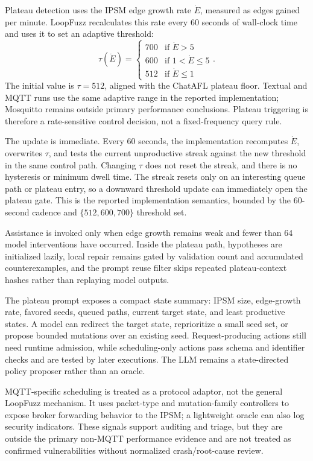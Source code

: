 \documentclass[final,5p,times,number]{elsarticle}
\begin{document}
Plateau detection uses the IPSM edge growth rate $\dot{E}$, measured as edges gained per minute. LoopFuzz recalculates this rate every 60 seconds of wall-clock time and uses it to set an adaptive threshold:
\[
\tau(\dot{E}) = \begin{cases}
700 & \text{if } \dot{E} > 5 \\
600 & \text{if } 1 < \dot{E} \le 5 \\
512 & \text{if } \dot{E} \le 1
\end{cases}.
\]
The initial value is $\tau{=}512$, aligned with the ChatAFL plateau floor. Textual and MQTT runs use the same adaptive range in the reported implementation; Mosquitto remains outside primary performance conclusions. Plateau triggering is therefore a rate-sensitive control decision, not a fixed-frequency query rule.

The update is immediate. Every 60 seconds, the implementation recomputes $\dot{E}$, overwrites $\tau$, and tests the current unproductive streak against the new threshold in the same control path. Changing $\tau$ does not reset the streak, and there is no hysteresis or minimum dwell time. The streak resets only on an interesting queue path or plateau entry, so a downward threshold update can immediately open the plateau gate. This is the reported implementation semantics, bounded by the 60-second cadence and $\{512,600,700\}$ threshold set.

Assistance is invoked only when edge growth remains weak and fewer than 64 model interventions have occurred. Inside the plateau path, hypotheses are initialized lazily, local repair remains gated by validation count and accumulated counterexamples, and the prompt reuse filter skips repeated plateau-context hashes rather than replaying model outputs.

The plateau prompt exposes a compact state summary: IPSM size, edge-growth rate, favored seeds, queued paths, current target state, and least productive states. A model can redirect the target state, reprioritize a small seed set, or propose bounded mutations over an existing seed. Request-producing actions still need runtime admission, while scheduling-only actions pass schema and identifier checks and are tested by later executions. The LLM remains a state-directed policy proposer rather than an oracle.

MQTT-specific scheduling is treated as a protocol adaptor, not the general LoopFuzz mechanism. It uses packet-type and mutation-family controllers to expose broker forwarding behavior to the IPSM; a lightweight oracle can also log security indicators. These signals support auditing and triage, but they are outside the primary non-MQTT performance evidence and are not treated as confirmed vulnerabilities without normalized crash/root-cause review.
\end{document}
